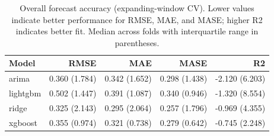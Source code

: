 \begin{table}
\caption{Overall forecast accuracy (expanding-window CV). Lower values indicate better performance for RMSE, MAE, and MASE; higher R2 indicates better fit. Median across folds with interquartile range in parentheses.}
\begin{tabular}{lrrrr}
\toprule
Model & RMSE & MAE & MASE & R2 \\
\midrule
arima & 0.360 (1.784) & 0.342 (1.652) & 0.298 (1.438) & -2.120 (6.203) \\
lightgbm & 0.502 (1.447) & 0.391 (1.087) & 0.340 (0.946) & -1.320 (8.554) \\
ridge & 0.325 (2.143) & 0.295 (2.064) & 0.257 (1.796) & -0.969 (4.355) \\
xgboost & 0.355 (0.974) & 0.321 (0.738) & 0.279 (0.642) & -0.745 (2.248) \\
\bottomrule
\end{tabular}
\end{table}
